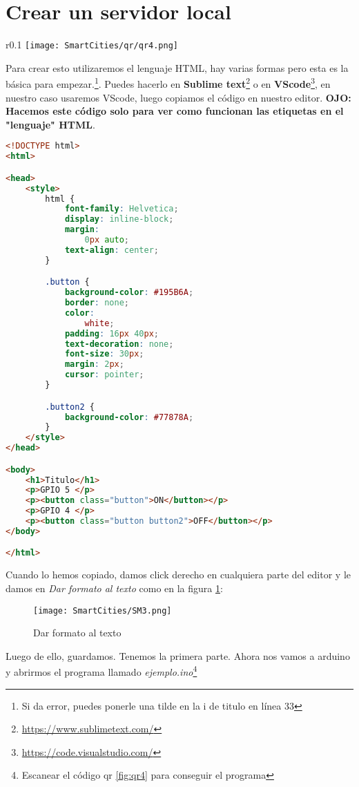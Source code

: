 \documentclass[11pt,fleqn]{book} %
\begin{document}
\section{Crear un servidor local}
\begin{wrapfigure}{r}{0.1\linewidth}
\centering\texttt{[image: SmartCities/qr/qr4.png]}
\caption{QR program: 4.Server local On Off led}
\label{fig:qr4}
\end{wrapfigure}
Para crear esto utilizaremos el lenguaje HTML, hay varias formas pero esta es la básica para empezar.\footnote{Si da error, puedes ponerle una tilde en la i de titulo en línea 33}. Puedes hacerlo en \textbf{Sublime text}\footnote{\url{https://www.sublimetext.com/}} o en \textbf{VScode}\footnote{\url{https://code.visualstudio.com/}}, en nuestro caso usaremos VScode, luego copiamos el código en nuestro editor. \textbf{OJO: Hacemos este código solo para ver como funcionan las etiquetas en el "lenguaje" HTML}.
\begin{lstlisting}[language=html, caption={Conectarse a una red WiFi},captionpos=b]
<!DOCTYPE html>
<html>

<head>
    <style>
        html {
            font-family: Helvetica;
            display: inline-block;
            margin:
                0px auto;
            text-align: center;
        }

        .button {
            background-color: #195B6A;
            border: none;
            color:
                white;
            padding: 16px 40px;
            text-decoration: none;
            font-size: 30px;
            margin: 2px;
            cursor: pointer;
        }

        .button2 {
            background-color: #77878A;
        }
    </style>
</head>

<body>
    <h1>Titulo</h1>
    <p>GPIO 5 </p>
    <p><button class="button">ON</button></p>
    <p>GPIO 4 </p>
    <p><button class="button button2">OFF</button></p>
</body>

</html>
\end{lstlisting}
Cuando lo hemos copiado, damos click derecho en cualquiera parte del editor y le damos en \textit{Dar formato al texto} como en la figura \ref{fig:VSformato}:
\begin{figure}[h]
\centering\texttt{[image: SmartCities/SM3.png]}
\caption{Dar formato al texto}
\label{fig:VSformato}
\end{figure}
Luego de ello, guardamos. Tenemos la primera parte.
Ahora nos vamos a arduino y abrirmos el programa llamado \textit{ejemplo.ino}\footnote{Escanear el código qr \ref{fig:qr4} para conseguir el programa}
\end{document}
